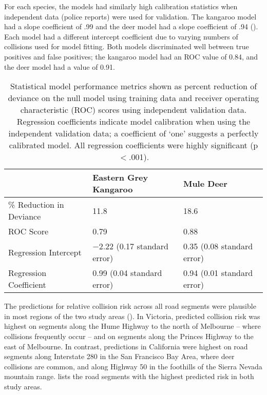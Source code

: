 For each species, the models had similarly high calibration statistics when independent data (police reports) were used for validation. The kangaroo model had a slope coefficient of .99 and the deer model had a slope coefficient of .94 (). Each model had a different intercept coefficient due to varying numbers of collisions used for model fitting. Both models discriminated well between true positives and false positives; the kangaroo model had an ROC value of 0.84, and the deer model had a value of 0.91.

\begin{table}[!h]
\caption[Statistical model performance for kangaroos and deer]{Statistical model performance metrics shown as percent reduction of deviance on the null model using training data and receiver operating characteristic (ROC) scores using independent validation data. Regression coefficients indicate model calibration when using the independent validation data; a coefficient of `one' suggests a perfectly calibrated model.  All regression coefficients were highly significant (p$<$.001).}
\centering
\begin{tabularx}{0.9\textwidth}{@{}lXX@{}} \toprule
                        	&Eastern Grey Kangaroo			&Mule Deer \\ \midrule 
\% Reduction in Deviance 	& 11.8							& 18.6  \\ 
ROC Score 					& 0.79							& 0.88	\\ 
Regression Intercept 		& $-$2.22 (0.17 standard error)	& 0.35 (0.08 standard error) \\ 
Regression Coefficient 		& 0.99 (0.04 standard error)	& 0.94 (0.01 standard error) \\ 
\bottomrule
\end{tabularx}
\label{cal_model_perf}
\end{table}

The predictions for relative collision risk across all road segments were plausible in most regions of the two study areas ().  In Victoria, predicted collision risk was highest on segments along the Hume Highway to the north of Melbourne -- where collisions frequently occur -- and on segments along the Princes Highway to the east of Melbourne. In contrast, predictions in California were highest on road segments along Interstate 280 in the San Francisco Bay Area, where deer collisions are common, and along Highway 50 in the foothills of the Sierra Nevada mountain range.  lists the road segments with the highest predicted risk in both study areas.

